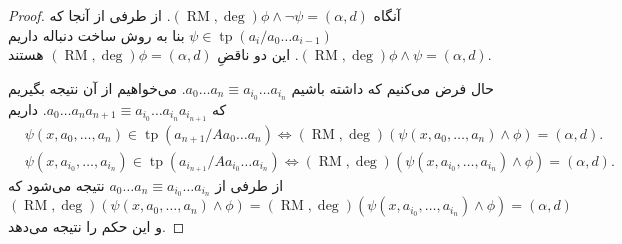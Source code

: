 \documentclass[12pt,a4paper]{report}
\theoremstyle{colorhead}
\DeclareMathOperator{\RM}{RM}
\DeclareMathOperator{\tp}{tp}
\begin{document}
\begin{proof}
آنگاه 
$(\RM,\deg)\phi \wedge\neg \psi =(\alpha,d)$.
از طرفی از آنجا که 
$\psi\in \tp(a_i/a_0\ldots a_{i-1})$
بنا به روش ساخت دنباله‌ داریم
$(\RM,\deg) \phi\wedge\psi =(\alpha,d)$.
این دو
ناقضِ
$(\RM,\deg)\phi=(\alpha,d)$
هستند.
\par 
حال فرض می‌کنیم که داشته باشیم
$a_0\ldots a_{n}\equiv a_{i_0}\ldots a_{i_n}$.
می‌خواهیم از آن نتیجه بگیریم که
$a_0\ldots a_{n}a_{n+1}\equiv a_{i_0}\ldots a_{i_n}a_{i_{n+1}}$.
داریم
\begin{align*}
& 
\psi(x,a_0,\ldots, a_n)\in \tp(a_{n+1}/Aa_0\ldots a_n) \Leftrightarrow
(\RM,\deg)(\psi(x,a_0,\ldots, a_n)\wedge\phi)=(\alpha,d).
\\
&
\psi(x,a_{i_0},\ldots, a_{i_n})\in \tp(a_{i_{n+1}}/Aa_{i_0}\ldots a_{i_n}) \Leftrightarrow
(\RM,\deg)(\psi(x,a_{i_0},\ldots, a_{i_n})\wedge\phi)=(\alpha,d).
\end{align*}
از طرفی از
$a_0\ldots a_n\equiv a_{i_0}\ldots a_{i_n}$
نتیجه می‌شود که
\[
(\RM,\deg)(\psi(x,a_0,\ldots, a_n)\wedge\phi)=
(\RM,\deg)(\psi(x,a_{i_0},\ldots, a_{i_n})\wedge\phi)=(\alpha,d)
\]
و این حکم را نتیجه می‌دهد.
\end{proof}
\end{document}
